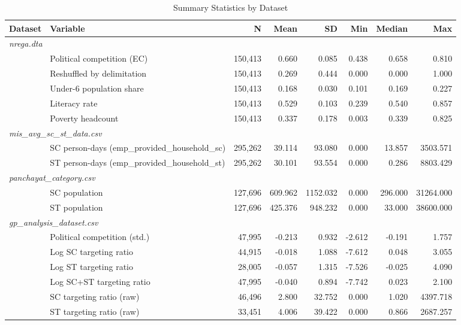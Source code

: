 \begin{table}[htbp]
\centering
\caption{Summary Statistics by Dataset}
\label{tab:summary_stats_datasets}
\small
\begin{tabular}{llrrrrrr}
\hline\hline
\textbf{Dataset} & \textbf{Variable} & \textbf{N} & \textbf{Mean} & \textbf{SD} & \textbf{Min} & \textbf{Median} & \textbf{Max} \\
\hline
\multicolumn{8}{l}{\textit{nrega.dta}} \\
 & Political competition (EC) & 150,413 & 0.660 & 0.085 & 0.438 & 0.658 & 0.810 \\
 & Reshuffled by delimitation & 150,413 & 0.269 & 0.444 & 0.000 & 0.000 & 1.000 \\
 & Under-6 population share & 150,413 & 0.168 & 0.030 & 0.101 & 0.169 & 0.227 \\
 & Literacy rate & 150,413 & 0.529 & 0.103 & 0.239 & 0.540 & 0.857 \\
 & Poverty headcount & 150,413 & 0.337 & 0.178 & 0.003 & 0.339 & 0.825 \\
\hline
\multicolumn{8}{l}{\textit{mis\_avg\_sc\_st\_data.csv}} \\
 & SC person-days (emp\_provided\_household\_sc) & 295,262 & 39.114 & 93.080 & 0.000 & 13.857 & 3503.571 \\
 & ST person-days (emp\_provided\_household\_st) & 295,262 & 30.101 & 93.554 & 0.000 & 0.286 & 8803.429 \\
\hline
\multicolumn{8}{l}{\textit{panchayat\_category.csv}} \\
 & SC population & 127,696 & 609.962 & 1152.032 & 0.000 & 296.000 & 31264.000 \\
 & ST population & 127,696 & 425.376 & 948.232 & 0.000 & 33.000 & 38600.000 \\
\hline
\multicolumn{8}{l}{\textit{gp\_analysis\_dataset.csv}} \\
 & Political competition (std.) & 47,995 & -0.213 & 0.932 & -2.612 & -0.191 & 1.757 \\
 & Log SC targeting ratio & 44,915 & -0.018 & 1.088 & -7.612 & 0.048 & 3.055 \\
 & Log ST targeting ratio & 28,005 & -0.057 & 1.315 & -7.526 & -0.025 & 4.090 \\
 & Log SC+ST targeting ratio & 47,995 & -0.040 & 0.894 & -7.742 & 0.023 & 2.100 \\
 & SC targeting ratio (raw) & 46,496 & 2.800 & 32.752 & 0.000 & 1.020 & 4397.718 \\
 & ST targeting ratio (raw) & 33,451 & 4.006 & 39.422 & 0.000 & 0.866 & 2687.257 \\

\end{tabular}
\end{table}
